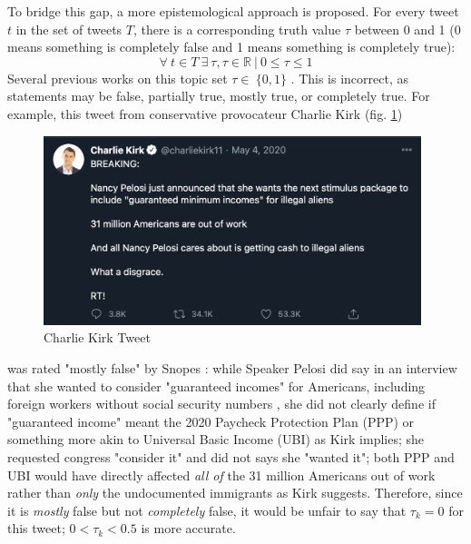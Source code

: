 \documentclass[preprint,review,12pt]{elsarticle}
\begin{document}
To bridge this gap, a more epistemological approach is proposed. For every tweet $t$ in the set of tweets $T$, there is a corresponding truth value $\tau$ between 0 and 1 (0 means something is completely false and 1 means something is completely true):
\begin{equation}
\label{truthvalues}
    \forall \ t \in T \ \exists \ \tau, \tau \in \mathbb{R} \ | \ 0 \leq \tau \leq 1
\end{equation}
Several previous works on this topic set $\tau \in \ \{0,1\}$ \cite{liu2018early,shu2017fake}. This is incorrect, as statements may be false, partially true, mostly true, or completely true. For example, this tweet from conservative provocateur Charlie Kirk (fig. \ref{fig:Charlie Kirk Tweet, May 4, 2020})  \begin{figure}[h]
    \centering
    \includegraphics[width=11cm]{CharlieKirk Tweet.png}
    \caption{Charlie Kirk Tweet}
    \label{fig:Charlie Kirk Tweet, May 4, 2020}
\end{figure} was rated "mostly false" by Snopes \cite{lee2020pelosi}: while Speaker Pelosi did say in an interview that she wanted to consider "guaranteed incomes" for Americans, including foreign workers without social security numbers \cite{pelosi2020maher}, she did not clearly define if "guaranteed income" meant the 2020 Paycheck Protection Plan (PPP) or something more akin to Universal Basic Income (UBI) as Kirk implies; she requested congress "consider it" and did not says she "wanted it"; both PPP and UBI would have directly affected \textit{all of} the 31 million Americans out of work rather than \textit{only} the undocumented immigrants as Kirk suggests. Therefore, since it is \textit{mostly} false but not \textit{completely} false, it would be unfair to say that $\tau_k = 0$ for this tweet; $ 0 < \tau_k < 0.5$ is more accurate. 
\end{document}
